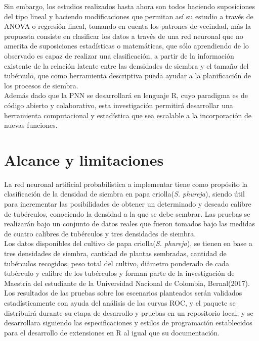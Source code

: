 Sin embargo, los estudios realizados hasta ahora son todos haciendo suposiciones del tipo lineal y haciendo modificaciones que permitan así su estudio a través de ANOVA o regresión lineal, tomando en cuenta los patrones de vecindad, más la propuesta consiste en clasificar los datos a través de una red neuronal que no amerita de suposiciones estadísticas o matemáticas, que sólo aprendiendo de lo observado es capaz de realizar una clasificación, a partir de la información existente de la relación latente entre las densidades de siembra y el tamaño del tubérculo, que como herramienta descriptiva pueda ayudar  a la planificación de los procesos de siembra.\\

Además dado que la PNN se desarrollará en lenguaje R, cuyo paradigma es de código abierto y colaborativo, esta investigación permitirá desarrollar una herramienta computacional y estadística que sea escalable a la incorporación de nuevas funciones.



\section{Alcance y limitaciones}

La red neuronal artificial probabilística a implementar tiene como propósito la clasificación de la densidad de siembra en papa criolla(\textit{S. phureja}), siendo útil para incrementar las posibilidades de obtener un determinado y deseado calibre de tubérculos, conociendo la densidad a la que se debe sembrar.  Las pruebas se realizarán bajo un conjunto de datos reales que fueron tomados bajo las medidas de cuatro calibres de tubérculos y tres densidades de siembra.\\

Los datos disponibles del cultivo de papa criolla(\textit{S. phureja}), se tienen en base a tres densidades de siembra, cantidad de plantas sembradas, cantidad de tubérculos recogidos, peso total del cultivo, diámetro ponderado de cada tubérculo y calibre de los tubérculos y forman parte de la investigación de Maestría del estudiante de la Universidad Nacional de Colombia, Bernal(2017).\\

Los resultados de las pruebas sobre los escenarios planteados serán validados estadísticamente con ayuda del análisis de las curvas ROC, y el paquete se distribuirá durante su etapa de desarrollo y pruebas en un repositorio local, y se desarrollara siguiendo las especificaciones y estilos de programación establecidos para el desarrollo de extensiones en R al igual que su documentación.\\


